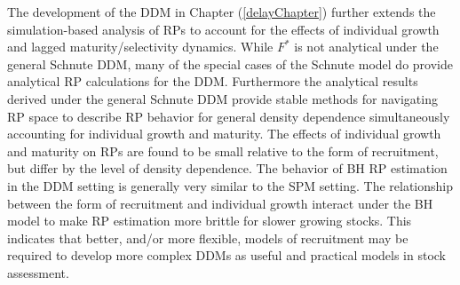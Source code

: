 \documentclass[12pt]{ucscthesis}
\begin{document}

%
The development of the DDM in Chapter (\ref{delayChapter}) further 
extends the simulation-based analysis of RPs to account for the effects of 
individual growth and lagged maturity/selectivity dynamics. While $F^*$ is not analytical 
under the general Schnute DDM, many of the special cases of the Schnute model 
do provide analytical RP calculations for the DDM.
Furthermore the analytical results derived under the general Schnute DDM 
provide stable methods for navigating RP space to describe RP behavior for 
general density dependence simultaneously accounting for individual growth 
and maturity. %
The effects of individual growth and maturity on RPs are found to be small 
relative to the form of recruitment, but differ by the level of density 
dependence. The behavior of BH RP estimation in the DDM setting is generally 
very similar to the SPM setting. The relationship between the form of recruitment 
and individual growth interact under the BH model to make RP estimation more 
brittle for slower growing stocks. This indicates that better, and/or more flexible, 
models of recruitment may be required to develop more complex DDMs as useful 
and practical models in stock assessment. 

\end{document}
